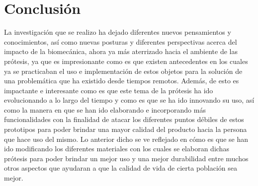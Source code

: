 \documentclass[a4paper]{article}
\begin{document}
\section{Conclusi\'on}
La investigación que se realizo ha dejado diferentes nuevos pensamientos y conocimientos, así como nuevas posturas y diferentes perspectivas acerca del impacto de la biomecánica, ahora ya más aterrizado hacia el ambiente de las prótesis, ya que es impresionante como es que existen antecedentes en los cuales ya se practicaban el uso e implementación de estos objetos para la solución de una problemática que ha existido desde tiempos remotos. Además, de esto es impactante e interesante como es que este tema de la prótesis ha ido evolucionando a lo largo del tiempo y como es que se ha ido innovando su uso, así como la manera en que se han ido elaborando e incorporando más funcionalidades con la finalidad de atacar los diferentes puntos débiles de estos prototipos para poder brindar una mayor calidad del producto hacia la persona que hace uso del mismo.  
Lo anterior dicho se ve reflejado en cómo es que se han ido modificando los diferentes materiales con los cuales se elaboran dichas prótesis para poder brindar un mejor uso y una mejor durabilidad entre muchos otros aspectos que ayudaran a que la calidad de vida de cierta población sea mejor. 



\end{document}
